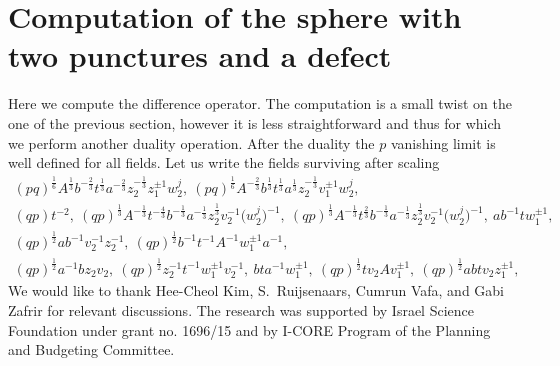 \documentclass[a4paper,12pt]{article}
\begin{document}
\section{Computation of the sphere with two punctures and a defect}
Here we compute the difference operator. The computation is a small twist on the one of the previous section, however it is less straightforward and thus  for which we perform another duality operation. After the duality the $p$ vanishing limit is well defined for all fields. Let us write the fields surviving after scaling
\begin{gather*}
(p q)^{\frac16}A^{\frac13}b^{-\frac23} t^{\frac13}a^{-\frac23} z_2^{-\frac13} z_1^{\pm1}w_2^j , \ (p q)^{\frac16}A^{-\frac23}b^{\frac13} t^{\frac13}a^{\frac13} z_2^{-\frac13} v_1^{\pm1} w_2^j , \\
(q p)t^{-2} , \ (q p)^{\frac13} A^{-\frac13} t^{-\frac43} b ^{-\frac13} a^{-\frac13} z_2^{\frac13} v_2^{-1} \big(w^j_2\big)^{-1} , \
 (q p)^{\frac13} A^{-\frac13} t^{\frac23} b ^{-\frac13} a^{-\frac13} z_2^{\frac13} v_2^{-1} \big(w^j_2\big)^{-1} , \
a b^{-1} t w_1^{\pm1} ,\\
( q p)^{ \frac1 2 }a b^{-1} v_2^ {-1} z_2^{-1} , \ ( q p)^{\frac12} b^{-1} t^{-1} A^{-1} w_1^{\pm1} a^{-1} ,\\
(q p)^{\frac12} a^{-1} b z_2 v_2 , \ (q p)^{\frac12} z_2^{-1} t^{-1} w_1^{\pm1} v_2^{-1} , \
b t a^{-1} w_1^{\pm1} , \ (q p)^{\frac12} t v_2 A v_1^{\pm1} , \ (q p)^{\frac12} a b t v_2 z_1^{\pm1} ,
\end{gather*}
We would like to thank Hee-Cheol Kim, S.~Ruijsenaars, Cumrun Vafa, and Gabi Zafrir for relevant discussions. The research was supported by Israel Science Foundation under grant no. 1696/15 and by I-CORE Program of the Planning and Budgeting Committee.
\end{document}
